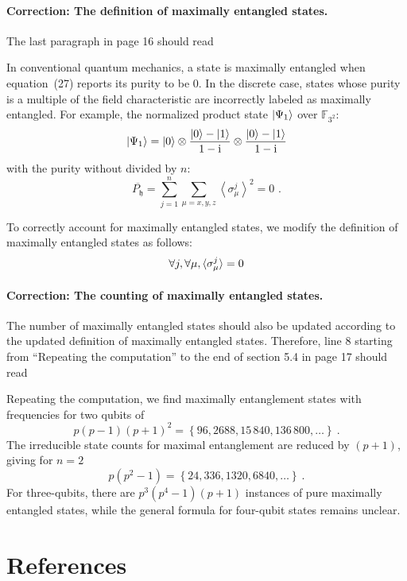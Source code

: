 \documentclass{iopart}
\newcommand{\ff}[1]{\mathbb{F}_{#1}}
\def\fh{\mathfrak{h}}
\begin{document}
\paragraph*{Correction: The definition of maximally entangled states.}

The last paragraph in page 16 should read

\medskip{}


In conventional quantum mechanics, a state is maximally entangled
when equation~(27) reports its purity to be 0. In the discrete case,
states whose purity is a multiple of the field characteristic are
incorrectly labeled as maximally entangled. For example, the normalized
product state $\ket{\Psi_{1}}$ over $\ff{3^{2}}$: 
\[
\ket{\Psi_{1}}=\ket{0}\otimes\frac{\ket{0}-\ket{1}}{1-\mathrm{i}}\otimes\frac{\ket{0}-\ket{1}}{1-\mathrm{i}}
\]
with the purity without divided by $n$: 
\[
\overline{P_{\fh}}=\sum_{j=1}^{n}\sum_{\mu=x,y,z}\left\langle \sigma_{\mu}^{j}\right\rangle ^{2}=0\textrm{ .}
\]


To correctly account for maximally entangled states, we modify the
definition of maximally entangled states as follows:
\[
\forall j,\forall\mu,\braket{\sigma_{\mu}^{j}}=0
\]
\medskip{}



\paragraph*{Correction: The counting of maximally entangled states.}

The number of maximally entangled states should also be updated according
to the updated definition of maximally entangled states. Therefore,
line 8 starting from ``Repeating the computation'' to the end of
section 5.4 in page 17 should read\medskip{}

Repeating the computation, we find maximally entanglement states with
frequencies for two qubits of 
\[
p\left(p-1\right)\left(p+1\right)^{2}=\left\{ 96,2688,15\,840,136\,800,\ldots\right\} \ .
\]
The irreducible state counts for maximal entanglement are reduced
by $\left(p+1\right)$, giving for $n=2$ 
\[
p\left(p^{2}-1\right)=\left\{ 24,336,1320,6840,\ldots\right\} \ .
\]
For three-qubits, there are $p^{3}\left(p^{4}-1\right)\left(p+1\right)$
instances of pure maximally entangled states, while the general formula
for four-qubit states remains unclear.



\section*{References}

{}



\end{document}
